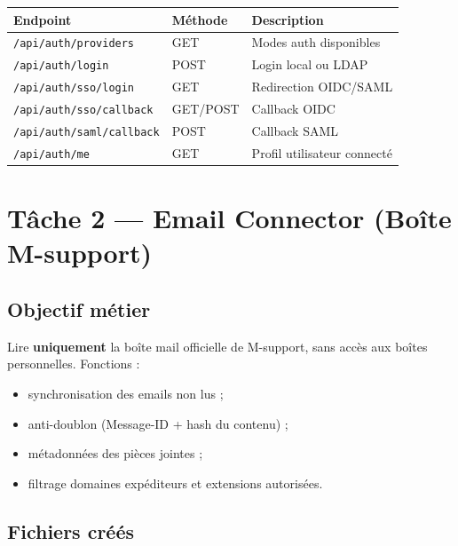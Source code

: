 \documentclass[12pt,a4paper]{article}
\begin{document}
\begin{tabular}{@{}lll@{}}
\toprule
Endpoint & Méthode & Description \\
\midrule
\texttt{/api/auth/providers} & GET & Modes auth disponibles \\
\texttt{/api/auth/login} & POST & Login local ou LDAP \\
\texttt{/api/auth/sso/login} & GET & Redirection OIDC/SAML \\
\texttt{/api/auth/sso/callback} & GET/POST & Callback OIDC \\
\texttt{/api/auth/saml/callback} & POST & Callback SAML \\
\texttt{/api/auth/me} & GET & Profil utilisateur connecté \\
\bottomrule
\end{tabular}

\newpage
\section{Tâche 2 --- Email Connector (Boîte M-support)}

\subsection{Objectif métier}

Lire \textbf{uniquement} la boîte mail officielle de M-support, sans accès aux boîtes personnelles. Fonctions :
\begin{itemize}
  \item synchronisation des emails non lus ;
  \item anti-doublon (Message-ID + hash du contenu) ;
  \item métadonnées des pièces jointes ;
  \item filtrage domaines expéditeurs et extensions autorisées.
\end{itemize}

\subsection{Fichiers créés}
\end{document}
